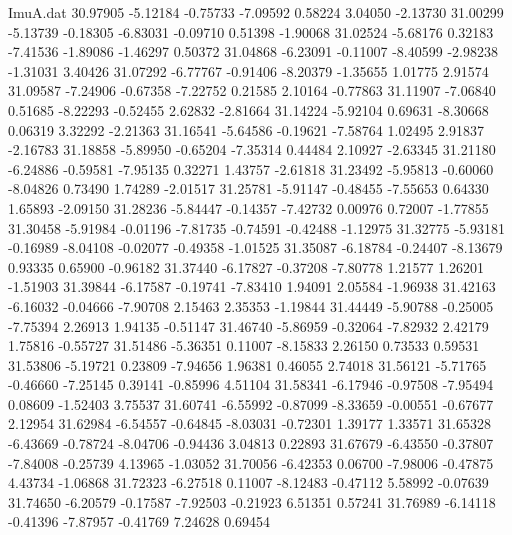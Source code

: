 \begin{filecontents}{ImuA.dat}
  30.97905   -5.12184   -0.75733   -7.09592    0.58224    3.04050   -2.13730
  31.00299   -5.13739   -0.18305   -6.83031   -0.09710    0.51398   -1.90068
  31.02524   -5.68176    0.32183   -7.41536   -1.89086   -1.46297    0.50372
  31.04868   -6.23091   -0.11007   -8.40599   -2.98238   -1.31031    3.40426
  31.07292   -6.77767   -0.91406   -8.20379   -1.35655    1.01775    2.91574
  31.09587   -7.24906   -0.67358   -7.22752    0.21585    2.10164   -0.77863
  31.11907   -7.06840    0.51685   -8.22293   -0.52455    2.62832   -2.81664
  31.14224   -5.92104    0.69631   -8.30668    0.06319    3.32292   -2.21363
  31.16541   -5.64586   -0.19621   -7.58764    1.02495    2.91837   -2.16783
  31.18858   -5.89950   -0.65204   -7.35314    0.44484    2.10927   -2.63345
  31.21180   -6.24886   -0.59581   -7.95135    0.32271    1.43757   -2.61818
  31.23492   -5.95813   -0.60060   -8.04826    0.73490    1.74289   -2.01517
  31.25781   -5.91147   -0.48455   -7.55653    0.64330    1.65893   -2.09150
  31.28236   -5.84447   -0.14357   -7.42732    0.00976    0.72007   -1.77855
  31.30458   -5.91984   -0.01196   -7.81735   -0.74591   -0.42488   -1.12975
  31.32775   -5.93181   -0.16989   -8.04108   -0.02077   -0.49358   -1.01525
  31.35087   -6.18784   -0.24407   -8.13679    0.93335    0.65900   -0.96182
  31.37440   -6.17827   -0.37208   -7.80778    1.21577    1.26201   -1.51903
  31.39844   -6.17587   -0.19741   -7.83410    1.94091    2.05584   -1.96938
  31.42163   -6.16032   -0.04666   -7.90708    2.15463    2.35353   -1.19844
  31.44449   -5.90788   -0.25005   -7.75394    2.26913    1.94135   -0.51147
  31.46740   -5.86959   -0.32064   -7.82932    2.42179    1.75816   -0.55727
  31.51486   -5.36351    0.11007   -8.15833    2.26150    0.73533    0.59531
  31.53806   -5.19721    0.23809   -7.94656    1.96381    0.46055    2.74018
  31.56121   -5.71765   -0.46660   -7.25145    0.39141   -0.85996    4.51104
  31.58341   -6.17946   -0.97508   -7.95494    0.08609   -1.52403    3.75537
  31.60741   -6.55992   -0.87099   -8.33659   -0.00551   -0.67677    2.12954
  31.62984   -6.54557   -0.64845   -8.03031   -0.72301    1.39177    1.33571
  31.65328   -6.43669   -0.78724   -8.04706   -0.94436    3.04813    0.22893
  31.67679   -6.43550   -0.37807   -7.84008   -0.25739    4.13965   -1.03052
  31.70056   -6.42353    0.06700   -7.98006   -0.47875    4.43734   -1.06868
  31.72323   -6.27518    0.11007   -8.12483   -0.47112    5.58992   -0.07639
  31.74650   -6.20579   -0.17587   -7.92503   -0.21923    6.51351    0.57241
  31.76989   -6.14118   -0.41396   -7.87957   -0.41769    7.24628    0.69454

\end{filecontents}
